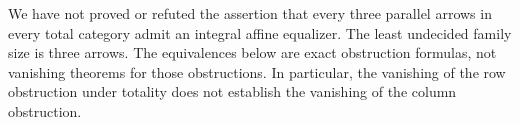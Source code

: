 \begin{obstruction}\label{B:triple-question}
We have not proved or refuted the assertion that every three parallel
arrows in every total category admit an integral affine equalizer.
The least undecided family size is three arrows. The equivalences below
are exact obstruction formulas, not vanishing theorems for those
obstructions. In particular, the vanishing of the row obstruction under
totality does not establish the vanishing of the column obstruction.
\end{obstruction}
